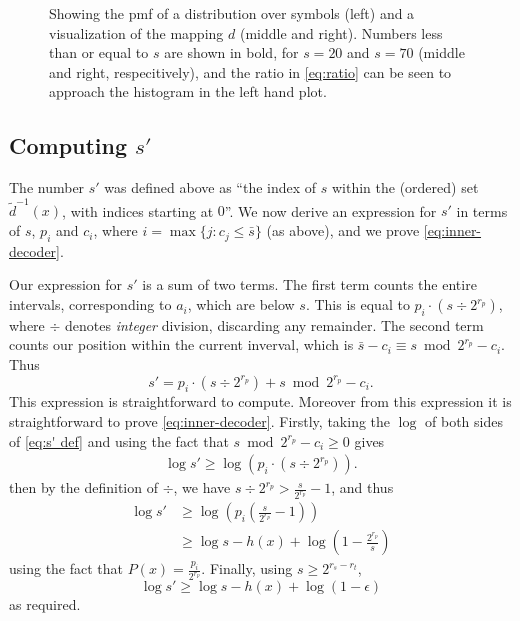\documentclass{article}
\theoremstyle{definition}
\begin{document}
\begin{figure}[h]
  \centering
  \drawpmf \quad {} \quad {}
  \caption{
    Showing the pmf of a distribution over symbols (left) and a visualization
    of the mapping \(d\) (middle and right).  Numbers less than or equal to
    \(s\) are shown in bold, for \(s=20\) and \(s=70\) (middle and right,
    respecitively), and the ratio in \cref{eq:ratio} can be seen to approach
    the histogram in the left hand plot.
  }\label{fig:visual-ans}
\end{figure}

\subsection{Computing \(s'\)}
The number \(s'\) was defined above as ``the index of \(s\) within the
(ordered) set \(\tilde d^{-1}(x)\), with indices starting at \(0\)''. We now
derive an expression for \(s'\) in terms of \(s\), \(p_i\) and \(c_i\), where
\(i = \max\{j: c_j \leq \bar s\}\) (as above), and we prove
\cref{eq:inner-decoder}.

Our expression for \(s'\) is a sum of two terms. The first term counts the
entire intervals, corresponding to \(a_i\), which are below \(s\). This is
equal to \(p_i \cdot (s \div 2^{r_p})\), where \(\div\) denotes \emph{integer}
division, discarding any remainder. The second term counts our position within
the current inverval, which is \(\bar s - c_i \equiv s\bmod 2^{r_p} - c_i\).
Thus
\begin{equation}\label{eq:s' def}
  s' = p_i \cdot (s \div 2^{r_p}) + s\bmod 2^{r_p} - c_i.
\end{equation}
This expression is straightforward to compute. Moreover from this expression it
is straightforward to prove \cref{eq:inner-decoder}. Firstly, taking the
\(\log\) of both sides of \cref{eq:s' def} and using the fact that \(s\bmod
2^{r_p} - c_i \geq 0\) gives
\begin{align}
  \log s' \geq \log (p_i\cdot (s\div 2^{r_p})).
\end{align}
then by the definition of \(\div\), we have \(s\div 2^{r_p} > \frac{s}{2^{r_p}}
- 1\), and thus
\begin{align}
  \log s'
    &\geq \log\left(p_i\left(\frac{s}{2^{r_p}} -1\right)\right)\\
    &\geq \log s - h(x) + \log\left(1 - \frac{2^{r_p}}{s}\right)
\end{align}
using the fact that \(P(x) = \frac{p_i}{2^{r_p}}\). Finally, using \(s \geq
2^{r_s - r_t}\),
\begin{equation}
  \log s' \geq \log s - h(x) + \log (1 - \epsilon)
\end{equation}
as required.
\end{document}
